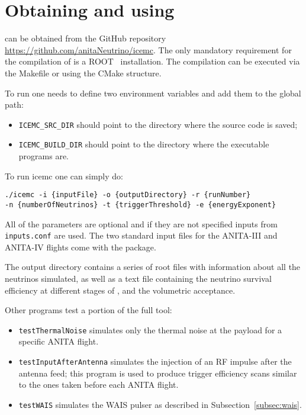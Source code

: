 \appendix

\section{Obtaining and using \icemc}
\icemc can be obtained from the GitHub repository \url{https://github.com/anitaNeutrino/icemc}.
The only mandatory requirement for the compilation of \icemc is a ROOT~\cite{brun1997root} installation.
The compilation can be executed via the Makefile or using the CMake structure.

To run \icemc one needs to define two environment variables and add them to the global path:
\begin{itemize}
    \item  \texttt{ICEMC\_SRC\_DIR} should point to the directory where the source code is saved;
    \item  \texttt{ICEMC\_BUILD\_DIR} should point to the directory where the executable programs are.
\end{itemize}

To run icemc one can simply do:
\begin{verbatim}
./icemc -i {inputFile} -o {outputDirectory} -r {runNumber}
-n {numberOfNeutrinos} -t {triggerThreshold} -e {energyExponent}
\end{verbatim}

All of the parameters are optional and if they are not specified inputs from \texttt{inputs.conf} are used. 
The two standard input files for the ANITA-III and ANITA-IV flights come with the package.

The output directory contains a series of root files with  information about all the neutrinos simulated, as well as a text file containing the neutrino survival efficiency at different stages of \icemc, and the volumetric acceptance.

Other programs test a portion of the full \icemc tool:
\begin{itemize}
    \item {\tt testThermalNoise} simulates only the thermal noise at the payload for a specific ANITA flight.
    \item {\tt testInputAfterAntenna} simulates the injection of an RF impulse after the antenna feed; this program is used to produce trigger efficiency scans similar to the ones taken before each ANITA flight.
    \item {\tt testWAIS} simulates the WAIS pulser as described in Subsection~\ref{subsec:wais}.
\end{itemize}

